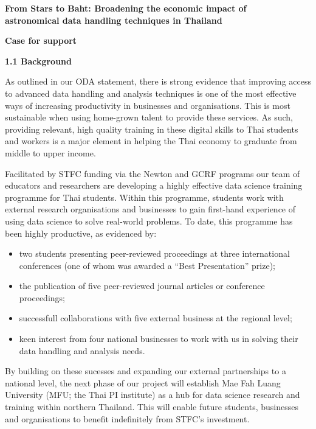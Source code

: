 \documentclass[11pt]{article}
\begin{document}
  \setcounter{figure}{0}
  \noindent
  {\LARGE \bf From Stars to Baht: Broadening the economic impact of \\
  astronomical data handling techniques in Thailand}
  
  \vspace{3mm}
  \noindent
  {\LARGE \bf Case for support}
  
  
  \vspace{3mm}
  \noindent
  {\large \bf 1.1 Background}
  
  \noindent
  As outlined in our ODA statement, there is strong evidence that improving access to advanced data handling and analysis techniques is one of the most effective ways of increasing productivity in businesses and organisations. This is most sustainable when using home-grown talent to provide these services. As such, providing relevant, high quality training in these digital skills to Thai students and workers is a major element in helping the Thai economy to graduate from middle to upper income. 

  \vspace{2mm}
  \noindent
  Facilitated by STFC funding via the Newton and GCRF programs our team of educators and researchers are developing a highly effective data science training programme for Thai students. Within this programme, students work with external research organisations and businesses to gain first-hand experience of using data science to solve real-world problems. To date, this programme has been highly productive, as evidenced by:
  \begin{itemize}
    \item two students presenting peer-reviewed proceedings at three international conferences (one of whom was awarded a ``Best Presentation'' prize);
    \item the publication of five peer-reviewed journal articles or conference proceedings;
    \item successfull collaborations with five external business at the regional level;
    \item keen interest from four national businesses to work with us in solving their data handling and analysis needs.
  \end{itemize}
  By building on these sucesses and expanding our external partnerships to a national level, the next phase of our project will establish Mae Fah Luang University (MFU; the Thai PI institute) as a hub for data science research and training within northern Thailand. This will enable future students, businesses and organisations to benefit indefinitely from STFC's investment.
  
\end{document}
